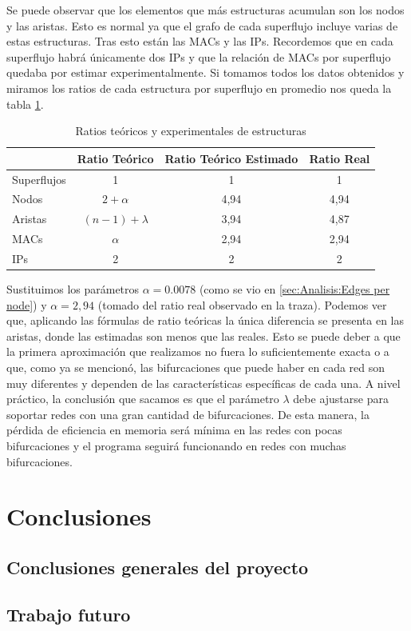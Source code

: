 \documentclass[twoside, 12pt]{epstfg}
\begin{document}
Se puede observar que los elementos que más estructuras acumulan son los nodos y las aristas. Esto es normal ya que el grafo de cada superflujo incluye varias de estas estructuras. Tras esto están las MACs y las IPs. Recordemos que en cada superflujo habrá únicamente dos IPs y que la relación de MACs por superflujo quedaba por estimar experimentalmente. Si tomamos todos los datos obtenidos y miramos los ratios de cada estructura por superflujo en promedio nos queda la tabla \ref{tab:Pruebas:Ratios estructuras}.

\begin{table}[hbtp]
	\centering
	\begin{tabular}{lccc}
		\toprule & \textbf{Ratio Teórico}  & \textbf{Ratio Teórico Estimado} & \textbf{Ratio Real} \\ 
		\midrule
		Superflujos & 1 & 1 & 1 \\
		Nodos & $2+\alpha$ & 4,94 & 4,94 \\
		Aristas & $(n-1)+\lambda$ & 3,94 & 4,87 \\
		MACs & $\alpha$ & 2,94 & 2,94 \\
		IPs & 2 & 2 & 2 \\ 
		\bottomrule
	\end{tabular}
	\caption{Ratios teóricos y experimentales de estructuras}
	\label{tab:Pruebas:Ratios estructuras}
\end{table}

Sustituimos los parámetros $\alpha = 0.0078$ (como se vio en \ref{sec:Analisis:Edges per node}) y $\alpha = 2,94$ (tomado del ratio real observado en la traza). Podemos ver que, aplicando las fórmulas de ratio teóricas la única diferencia se presenta en las aristas, donde las estimadas son menos que las reales. Esto se puede deber a que la primera aproximación que realizamos no fuera lo suficientemente exacta o a que, como ya se mencionó, las bifurcaciones que puede haber en cada red son muy diferentes y dependen de las características específicas de cada una. A nivel práctico, la conclusión que sacamos es que el parámetro $\lambda$ debe ajustarse para soportar redes con una gran cantidad de bifurcaciones. De esta manera, la pérdida de eficiencia en memoria será mínima en las redes con pocas bifurcaciones y el programa seguirá funcionando en redes con muchas bifurcaciones.

\chapter{Conclusiones}
\label{chap:Conclusiones}

\section{Conclusiones generales del proyecto}

\section{Trabajo futuro}

\backmatter
\appendix

\cleardoublepage

\nocite{*}
{}

\cleardoublepage
\printindex
\end{document}
